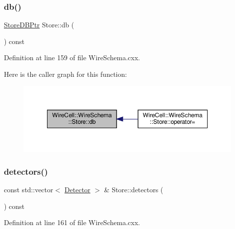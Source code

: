 \subsubsection{\texorpdfstring{db()}{db()}}
{\footnotesize\ttfamily \hyperlink{namespace_wire_cell_1_1_wire_schema_a9b93b8d397f153737ab0ba52066308e2}{Store\+D\+B\+Ptr} Store\+::db (\begin{DoxyParamCaption}{ }\end{DoxyParamCaption}) const}



Definition at line 159 of file Wire\+Schema.\+cxx.

Here is the caller graph for this function\+:
\nopagebreak
\begin{figure}[H]
\begin{center}
\leavevmode
\includegraphics[width=348pt]{class_wire_cell_1_1_wire_schema_1_1_store_aa81035f87804b21da2d018194eed8d85_icgraph}
\end{center}
\end{figure}
\mbox{\label{class_wire_cell_1_1_wire_schema_1_1_store_ae758694bfc0ca7fbdb51982b362c0c8c}} 
\subsubsection{\texorpdfstring{detectors()}{detectors()}}
{\footnotesize\ttfamily const std\+::vector$<$ \hyperlink{struct_wire_cell_1_1_wire_schema_1_1_detector}{Detector} $>$ \& Store\+::detectors (\begin{DoxyParamCaption}{ }\end{DoxyParamCaption}) const}



Definition at line 161 of file Wire\+Schema.\+cxx.

\mbox{\label{class_wire_cell_1_1_wire_schema_1_1_store_af499deefaf681bf7cb59cb564250504f}} 
